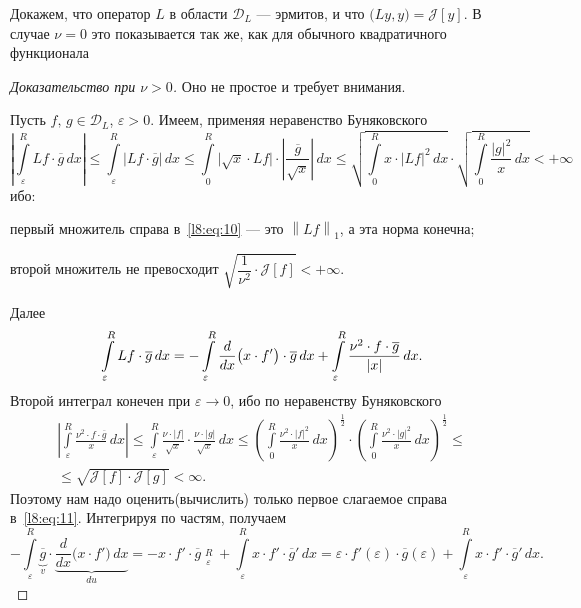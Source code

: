 \documentclass[12pt,a4paper,openany,fleqn]{book}
\newcommand{\J}{\ensuremath{\mathcal{J}}}
\newcommand{\mc}[1]{\ensuremath{\mathcal{#1}}}
\newcommand{\der}[2]{\ensuremath{\frac{d#1}{d#2}}}
\newcommand{\eps}{\varepsilon}
\newcommand{\norm}[1]{\ensuremath{\left\|#1\right\|}}
\theoremstyle{definition}
\begin{document}
	Докажем, что оператор $L$ в области $\mc{D}_L$ --- эрмитов, и что $\big(Ly,y\big)=\J[y]$. В случае $\nu=0$ это показывается так же, как для обычного квадратичного функционала
	\begin{proof}[Доказательство при $\nu>0$]
		Оно не простое и требует внимания.
		
		Пусть $f,\,g\in\mc{D}_L$, $\eps>0$. Имеем, применяя неравенство Буняковского
		\begin{equation}\label{l8:eq:10}
			\left|\int\limits_{\eps}^R Lf\cdot\overline{g}\,dx\right|\leqslant\int\limits_{\eps}^R\big|Lf\cdot\overline{g}\big|\,dx\leqslant\int\limits_{0}^R\big|\sqrt{x}\cdot Lf\big|\cdot\left|\frac{\overline{g}}{\sqrt{x}}\right|\,dx\leqslant\sqrt{\int\limits_{0}^R x\cdot\big|Lf\big|^2\,dx}\cdot\sqrt{\int\limits_{0}^R \frac{|g|^2}{x}\,dx}<+\infty
		\end{equation}
		ибо:
		\begin{enumeraterm}
			\item первый множитель справа в~\eqref{l8:eq:10} --- это $\norm{Lf}_1$, а эта норма конечна;
			\item второй множитель не превосходит $\sqrt{\dfrac{1}{\nu^2}\cdot\J[f]}<+\infty$.
		\end{enumeraterm}
		Далее
		\begin{equation}\label{l8:eq:11}
			\hfill\int\limits_{\eps}^R Lf\cdot\overline{g}\,dx=-\int\limits_{\eps}^R\der{}{x}\big(x\cdot f'\big)\cdot\overline{g}\,dx+\int\limits_{\eps}^R\frac{\nu^2\cdot f\cdot\overline{g}}{|x|}\,dx.\hfill
		\end{equation}
		Второй интеграл конечен при $\eps\to0$, ибо по неравенству Буняковского
		\begin{multline}\label{l8:eq:12}
			\left|\int\limits_{\eps}^R\frac{\nu^2\cdot f\cdot\overline{g}}{x}\,dx\right|\leqslant\int\limits_{\eps}^R\frac{\nu\cdot|f|}{\sqrt{x}}\cdot\frac{\nu\cdot|g|}{\sqrt{x}}\,dx\leqslant\left(\int\limits_{0}^R\frac{\nu^2\cdot|f|^2}{x}\,dx\right)^{\!\!\!\textstyle\frac{1}{2}}\cdot\left(\int\limits_{0}^R\frac{\nu^2\cdot|g|^2}{x}\,dx\right)^{\!\!\!\textstyle\frac{1}{2}}\leqslant\\
			\leqslant\sqrt{\J[f]\cdot\J[g]}<\infty.
		\end{multline}
		Поэтому нам надо оценить(вычислить) только первое слагаемое справа в~\eqref{l8:eq:11}. Интегрируя по частям, получаем
		\begin{equation}\label{l8:eq:13}
			-\int\limits_{\eps}^R\underbrace{\overline{g}}_{v}\cdot\underbrace{\der{}{x}\Big(x\cdot f'\Big)\,dx}_{du}=-x\cdot f'\cdot\overline{g}\mathop{\Big|}\limits_{\eps}^R+\int\limits_{\eps}^R x\cdot f'\cdot\overline{g}'\,dx=\eps\cdot f'(\eps)\cdot\overline{g}(\eps)+\int\limits_{\eps}^R x\cdot f'\cdot\overline{g}'\,dx.

\end{equation}
\end{proof}
\end{document}

